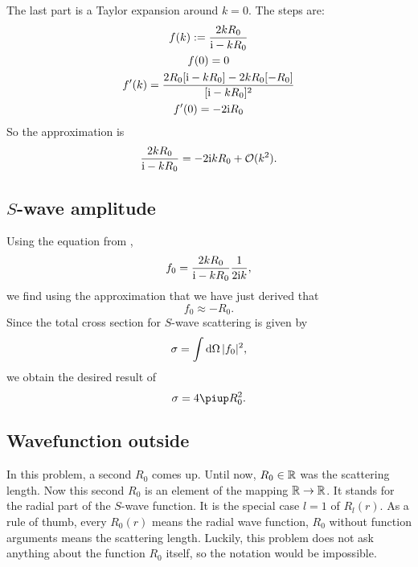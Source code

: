 \documentclass[11pt, english, fleqn, DIV=15, headinclude, BCOR=1.5cm]{scrartcl}
\begin{document}
The last part is a Taylor expansion around $k = 0$. The steps are:
\begin{gather*}
    f(k) := \frac{2 k R_0}{\mathrm i - k R_0} \\ 
    f(0) = 0 \\
    f'(k) = \frac{2 R_0 [\mathrm i - kR_0] - 2 k R_0[-R_0]}{[\mathrm i - kR_0]^2} \\
    f'(0) = - 2 \mathrm i R_0
\end{gather*}
So the approximation is
\[
    \frac{2 k R_0}{\mathrm i - k R_0}
    = - 2 \mathrm i k R_0 + \mathcal O(k^2).
\]

\subsection{$S$-wave amplitude}

Using the equation from \parencite[(18.96)]{Schwabl/Quantenmechanik},
\[
    f_0 = \frac{2kR_0}{\mathrm i - k R_0} \frac{1}{2 \mathrm i k},
\]
we find using the approximation that we have just derived that
\[
    f_0 \approx - R_0.
\]
Since the total cross section for $S$-wave scattering is given by
\[
    \sigma = \int \mathop{}\!\mathrm d \Omega \, |f_0|^2,
\]
we obtain the desired result of
\[
    \sigma = 4 \piup R_0^2.
\]

\subsection{Wavefunction outside}

In this problem, a second $R_0$ comes up. Until now, $R_0 \in \mathbb R$ was the
scattering length. Now this second $R_0$ is an element of the mapping $\mathbb R \to
\mathbb R$. It stands for the radial part of the $S$-wave function. It is the special
case $l = 1$ of $R_l(r)$. As a rule of thumb, every $R_0(r)$ means the radial
wave function, $R_0$ without function arguments means the scattering length.
Luckily, this problem does not ask anything about the function $R_0$ itself, so
the notation would be impossible.
\end{document}
